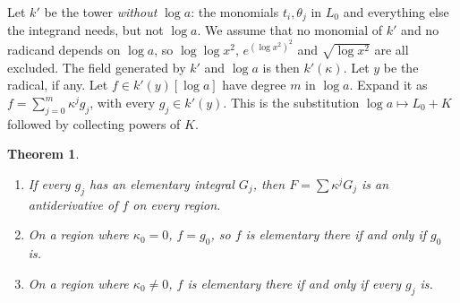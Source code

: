 \documentclass[11pt]{article}
\newtheorem{theorem}{Theorem}[section]
\theoremstyle{definition}
\theoremstyle{remark}
\begin{document}
Let $k'$ be the tower \emph{without} $\log a$: the monomials $t_i,\theta_j$ in
$L_0$ and everything else the integrand needs, but not $\log a$. We assume that
no monomial of $k'$ and no radicand depends on $\log a$, so $\log\log x^2$,
$e^{(\log x^2)^2}$ and $\sqrt{\log x^2}$ are all excluded. The field generated by
$k'$ and $\log a$ is then $k'(\kappa)$. Let $y$ be the radical, if any. Let
$f\in k'(y)[\log a]$ have degree $m$ in $\log a$. Expand it as
$f=\sum_{j=0}^m\kappa^jg_j$, with every $g_j\in k'(y)$. This is the substitution
$\log a\mapsto L_0+K$ followed by collecting powers of $K$.

\begin{theorem}\label{thm:kappa}
\leavevmode
\begin{enumerate}
\item If every $g_j$ has an elementary integral $G_j$, then
  $F=\sum\kappa^jG_j$ is an antiderivative of $f$ on every region.
\item On a region where $\kappa_0=0$, $f=g_0$, so $f$ is elementary there if
  and only if $g_0$ is.
\item On a region where $\kappa_0\ne0$, $f$ is elementary there if and only if
  every $g_j$ is.
\end{enumerate}
\end{theorem}
\end{document}
